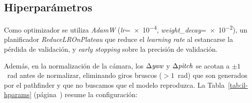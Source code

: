 \subsection{Hiperparámetros}
Como optimizador se utiliza \textit{AdamW}
(\textit{lr}=\num{e-4}, \textit{weight\_decay}=\num{e-2}), un planificador
\textit{ReduceLROnPlateau} que reduce el \textit{learning rate} al estancarse la
pérdida de validación, y \textit{early stopping} sobre la precisión de validación.

Además, en la normalización de la cámara, los
$\Delta\text{\textit{yaw}}$ y $\Delta\text{\textit{pitch}}$ se acotan a $\pm\num{1}$~rad antes de normalizar,
eliminando giros bruscos ($>\num{1}$~rad) que son generados por el \gls{pathfinder} y
que no buscamos que el modelo reproduzca. La Tabla~\ref{tab:il-hparams} (página~\pageref{tab:il-hparams}) resume la
configuración:

\begin{table}[htbp]
  \centering
  \caption[Configuración de entrenamiento del agente de imitación]{Configuración de entrenamiento del agente \gls{il}.}
  \label{tab:il-hparams}
\end{table}

